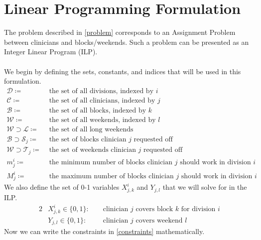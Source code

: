 \documentclass[]{article}
\newcommand{\mc}{\mathcal}
\begin{document}
\section{Linear Programming Formulation}
The problem described in \ref{problem} corresponds to an Assignment Problem between clinicians and blocks/weekends. Such a problem can be presented as an Integer Linear Program (ILP).  \\ \\
We begin by defining the sets, constants, and indices that will be used in this formulation.
	\begin{align*}
		\mc{D}\coloneqq &\text{ the set of all divisions, indexed by } i \\
		\mc{C}\coloneqq &\text{ the set of all clinicians, indexed by } j \\
		\mc{B}\coloneqq &\text{ the set of all blocks, indexed by } k \\
		\mc{W}\coloneqq &\text{ the set of all weekends, indexed by } l \\
		\mc{W} \supset \mc{L}\coloneqq &\text{ the set of all long weekends} \\
		\mc{B} \supset \mc{S}_j\coloneqq &\text{ the set of blocks clinician } j \text{ requested off} \\
		\mc{W} \supset \mc{T}_j\coloneqq &\text{ the set of weekends clinician } j \text{ requested off} \\
		m^i_j \coloneqq &\text{ the minimum number of blocks clinician } j \text{ should work in division } i \\
		M^i_j \coloneqq &\text{ the maximum number of blocks clinician } j \text{ should work in division } i
	\end{align*}
We also define the set of 0-1 variables $X^i_{j,k}$ and $Y_{j,l}$ that we will solve for in the ILP.
	\begin{alignat}{2}
		&X^i_{j,k} \in \{0, 1\}: &&\text{ clinician } j \text{ covers block } k \text{ for division } i \\
		&Y_{j, l} \in \{0, 1\}: &&\text{ clinician } j \text{ covers weekend } l
	\end{alignat}
Now we can write the constraints in \ref{constraints} mathematically.
\end{document}
